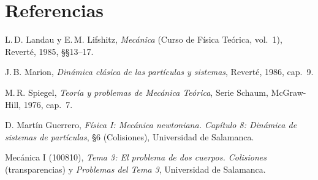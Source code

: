 \section{Referencias}
\label{sec:referencias}

\begin{enumerate}[label={\textcolor{cian}{[\arabic*]}},leftmargin=2.2em,itemsep=1ex]
  \item L.\,D. Landau y E.\,M. Lifshitz, \emph{Mecánica} (Curso de Física Teórica, vol.~1),
        Reverté, 1985, §§13--17.
  \item J.\,B. Marion, \emph{Dinámica clásica de las partículas y sistemas},
        Reverté, 1986, cap.~9.
  \item M.\,R. Spiegel, \emph{Teoría y problemas de Mecánica Teórica},
        Serie Schaum, McGraw-Hill, 1976, cap.~7.
  \item D. Martín Guerrero, \emph{Física I: Mecánica newtoniana. Capítulo 8:
        Dinámica de sistemas de partículas}, §6 (Colisiones), Universidad de Salamanca.
  \item Mecánica I (100810), \emph{Tema 3: El problema de dos cuerpos. Colisiones}
        (transparencias) y \emph{Problemas del Tema 3}, Universidad de Salamanca.
\end{enumerate}
